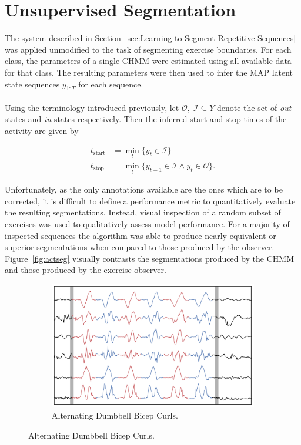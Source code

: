 \documentclass[12pt]{report}
\newcommand{\1}[0]{\mathbbm{1}}
\newcommand{\seq}[3]{\ensuremath{#1_{{#2}:{#3}}}}
\begin{document}
\section{Unsupervised Segmentation}
\label{sec:Unsupervised Segmentation}
The system described in Section~\ref{sec:Learning to Segment Repetitive Sequences} was applied unmodified
to the task of segmenting exercise boundaries. For each class, the parameters of a single \ac{CHMM}
were estimated using all available data for that class. The resulting parameters were then
used to infer the \ac{MAP} latent state sequences $\seq{y}{1}{T}$ for each sequence.
\\\\
Using the terminology introduced previously, let $\mathcal{O},\; \mathcal{I} \subseteq Y$
denote the set of \emph{out} states and \emph{in} states respectively.
Then the inferred start and stop times of the activity are given by

\begin{align*}
    t_\text{start} &= \min_t\{ y_t \in \mathcal{I}\} \\
    t_\text{stop} &= \min_t\{y_{t-1} \in \mathcal{I} \land y_t \in \mathcal{O}\}.
\end{align*}

Unfortunately, as the only annotations available are the ones which are to be corrected,
it is difficult to define a performance metric to quantitatively evaluate the resulting segmentations.
Instead, visual inspection of a random subset of exercises was used to qualitatively assess model performance.
For a majority of inspected sequences the algorithm was able to produce nearly equivalent or superior segmentations
when compared to those produced by the observer. Figure~\ref{fig:actseg} visually contrasts the segmentations
produced by the \ac{CHMM} and those produced by the exercise observer.

\begin{figure}[H]
    \centering
    \begin{subfigure}{\textwidth}
        \includegraphics[width=\textwidth]{img/segmentation/alt_db_bicep_curl.pdf}
        \caption{Alternating Dumbbell Bicep Curls.}
        \label{fig:actseg:alt-db-curl}
    \end{subfigure}
\end{figure}
\end{document}
